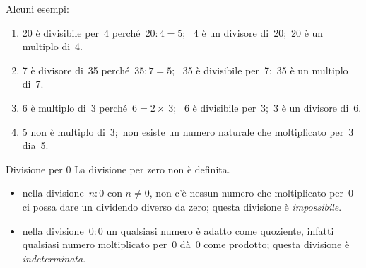 
 \begin{esempio}{}{}
Alcuni esempi:
\begin{enumerate} [noitemsep]
\item 20 è divisibile per~4 perché~\(20:4=5\);~
4 è un divisore di~20;~20 è un multiplo di~4.
\item 7 è divisore di~35 perché~\(35:7=5\);~ 
35 è divisibile per~7;~35 è un multiplo di~7.
\item 6 è multiplo di~3 perché~\(6=2\times~3\);~
6 è divisibile per~3;~3 è un divisore di~6.
\item 5 non è multiplo di~3;~non esiste un numero naturale che moltiplicato 
per~3 dia~5.
\end{enumerate}
\end{esempio}

\begin{osservazioni}{Divisione per 0}{}
La divisione per zero non è definita.
\begin{itemize}[nosep]
\item nella divisione~\(n:0\) con \(n\neq 0\), non c'è nessun numero che 
moltiplicato per~0 ci possa dare un dividendo diverso da zero; 
questa divisione è \emph{impossibile}.
\item nella divisione~\(0:0\) un qualsiasi numero è adatto come quoziente, 
infatti qualsiasi numero moltiplicato per~0 dà~0 come prodotto; 
questa divisione è \emph{indeterminata}.
\end{itemize}
\end{osservazioni}



% 
% 

